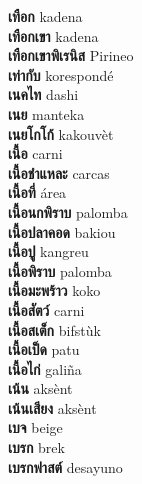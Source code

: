 \textbf{ เทือก  } kadena \\
\textbf{ เทือกเขา  } kadena \\
\textbf{ เทือกเขาพิเรนิส  } Pirineo \\
\textbf{ เท่ากับ  } korespondé \\
\textbf{ เนคไท  } dashi \\
\textbf{ เนย  } manteka \\
\textbf{ เนยโกโก้  } kakouvèt \\
\textbf{ เนื้อ  } carni \\
\textbf{ เนื้อชำแหละ  } carcas \\
\textbf{ เนื้อที่  } área \\
\textbf{ เนื้อนกพิราบ  } palomba \\
\textbf{ เนื้อปลาคอด  } bakiou \\
\textbf{ เนื้อปู  } kangreu \\
\textbf{ เนื้อพิราบ  } palomba \\
\textbf{ เนื้อมะพร้าว  } koko \\
\textbf{ เนื้อสัตว์  } carni \\
\textbf{ เนื้อสเต็ก  } bifstùk \\
\textbf{ เนื้อเป็ด  } patu \\
\textbf{ เนื้อไก่  } galiña \\
\textbf{ เน้น  } aksènt \\
\textbf{ เน้นเสียง  } aksènt \\
\textbf{ เบจ  } beige \\
\textbf{ เบรก  } brek \\
\textbf{ เบรกฟาสต์  } desayuno \\
